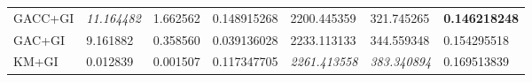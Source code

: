 \begin{table}[H]
\begin{tabular}{lllllll}
        GACC+GI    & \textit{11.164482}                                                  & 1.662562                                                              & 0.148915268                                                                        & 2200.445359          & 321.745265            & \textbf{0.146218248}              \\
        GAC+GI     & 9.161882                                                            & 0.358560                                                              & 0.039136028                                                                        & 2233.113133          & 344.559348            & 0.154295518                       \\
        KM+GI      & 0.012839                                                            & 0.001507                                                              & 0.117347705                                                                        & \textit{2261.413558} & \textit{383.340894}   & 0.169513839
    \end{tabular}
\end{table}
